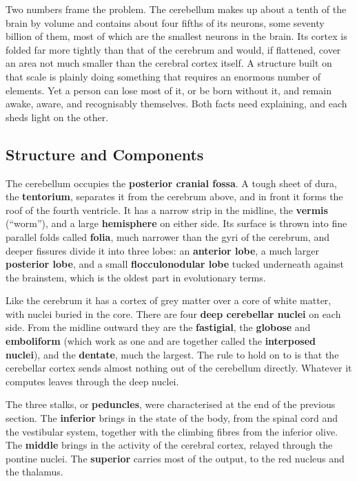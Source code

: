 \documentclass[11pt]{article}
\begin{document}
Two numbers frame the problem. The cerebellum makes up about a tenth of the brain by volume and contains about four fifths of its neurons, some seventy billion of them, most of which are the smallest neurons in the brain. Its cortex is folded far more tightly than that of the cerebrum and would, if flattened, cover an area not much smaller than the cerebral cortex itself. A structure built on that scale is plainly doing something that requires an enormous number of elements. Yet a person can lose most of it, or be born without it, and remain awake, aware, and recognisably themselves. Both facts need explaining, and each sheds light on the other.

\subsection{Structure and Components}

The cerebellum occupies the \textbf{posterior cranial fossa}. A tough sheet of dura, the \textbf{tentorium}, separates it from the cerebrum above, and in front it forms the roof of the fourth ventricle. It has a narrow strip in the midline, the \textbf{vermis} (``worm''), and a large \textbf{hemisphere} on either side. Its surface is thrown into fine parallel folds called \textbf{folia}, much narrower than the gyri of the cerebrum, and deeper fissures divide it into three lobes: an \textbf{anterior lobe}, a much larger \textbf{posterior lobe}, and a small \textbf{flocculonodular lobe} tucked underneath against the brainstem, which is the oldest part in evolutionary terms.

Like the cerebrum it has a cortex of grey matter over a core of white matter, with nuclei buried in the core. There are four \textbf{deep cerebellar nuclei} on each side. From the midline outward they are the \textbf{fastigial}, the \textbf{globose} and \textbf{emboliform} (which work as one and are together called the \textbf{interposed nuclei}), and the \textbf{dentate}, much the largest. The rule to hold on to is that the cerebellar cortex sends almost nothing out of the cerebellum directly. Whatever it computes leaves through the deep nuclei.

The three stalks, or \textbf{peduncles}, were characterised at the end of the previous section. The \textbf{inferior} brings in the state of the body, from the spinal cord and the vestibular system, together with the climbing fibres from the inferior olive. The \textbf{middle} brings in the activity of the cerebral cortex, relayed through the pontine nuclei. The \textbf{superior} carries most of the output, to the red nucleus and the thalamus.
\end{document}
